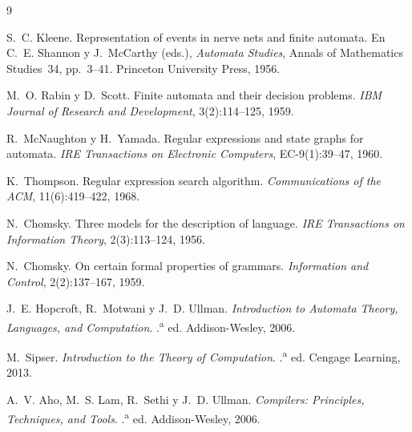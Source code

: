 \documentclass[11pt, a4paper]{article}
\theoremstyle{plain}
\theoremstyle{definition}
\begin{document}
\begin{thebibliography}{9}

S.~C. Kleene.
\newblock Representation of events in nerve nets and finite automata.
\newblock En C.~E. Shannon y J.~McCarthy (eds.), \emph{Automata Studies}, Annals of
  Mathematics Studies~34, pp.~3--41. Princeton University Press, 1956.

M.~O. Rabin y D.~Scott.
\newblock Finite automata and their decision problems.
\newblock \emph{IBM Journal of Research and Development}, 3(2):114--125, 1959.

R.~McNaughton y H.~Yamada.
\newblock Regular expressions and state graphs for automata.
\newblock \emph{IRE Transactions on Electronic Computers}, EC-9(1):39--47, 1960.

K.~Thompson.
\newblock Regular expression search algorithm.
\newblock \emph{Communications of the ACM}, 11(6):419--422, 1968.

N.~Chomsky.
\newblock Three models for the description of language.
\newblock \emph{IRE Transactions on Information Theory}, 2(3):113--124, 1956.

N.~Chomsky.
\newblock On certain formal properties of grammars.
\newblock \emph{Information and Control}, 2(2):137--167, 1959.

J.~E. Hopcroft, R.~Motwani y J.~D. Ullman.
\newblock \emph{Introduction to Automata Theory, Languages, and Computation}.
.\textsuperscript{a} ed. Addison-Wesley, 2006.

M.~Sipser.
\newblock \emph{Introduction to the Theory of Computation}.
.\textsuperscript{a} ed. Cengage Learning, 2013.

A.~V. Aho, M.~S. Lam, R.~Sethi y J.~D. Ullman.
\newblock \emph{Compilers: Principles, Techniques, and Tools}.
.\textsuperscript{a} ed. Addison-Wesley, 2006.

\end{thebibliography}
\end{document}
